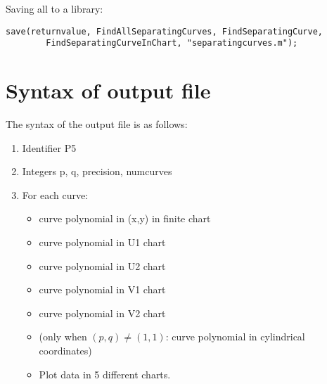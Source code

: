 \documentclass[a4paper,10pt]{article}
\begin{document}
Saving all to a library:

\begin{lstlisting}[name=separatingcurves]
save(returnvalue, FindAllSeparatingCurves, FindSeparatingCurve,
        FindSeparatingCurveInChart, "separatingcurves.m");
\end{lstlisting}

\section{Syntax of output file}

The syntax of the output file is as follows:

\begin{enumerate}
\item
    Identifier P5
\item
    Integers p, q, precision, numcurves
\item
    For each curve:
    \begin{itemize}
    \item
        curve polynomial in (x,y) in finite chart
    \item
        curve polynomial in U1 chart
    \item
        curve polynomial in U2 chart
    \item
        curve polynomial in V1 chart
    \item
        curve polynomial in V2 chart
    \item
        (only when $(p,q)\not=(1,1)$: curve polynomial in cylindrical
        coordinates)
    \item
        Plot data in 5 different charts.
    \end{itemize}
\end{enumerate}
\end{document}
